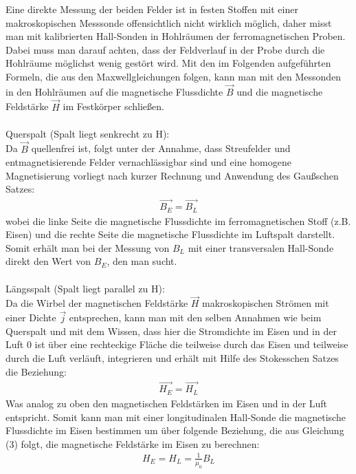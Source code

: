 \documentclass[a4paper,10pt]{scrartcl}
\begin{document}
		Eine direkte Messung der beiden Felder ist in festen Stoffen mit einer makroskopischen Messsonde offensichtlich nicht wirklich möglich, daher misst man mit kalibrierten Hall-Sonden in Hohlräumen der ferromagnetischen Proben. Dabei muss man darauf achten, dass der Feldverlauf in der Probe durch die Hohlräume möglichst wenig gestört wird. Mit den im Folgenden aufgeführten Formeln, die aus den Maxwellgleichungen folgen, kann man mit den Messonden in den Hohlräumen auf die magnetische Flussdichte \(\vec{B}\) und die magnetische Feldstärke \(\vec{H}\) im Festkörper schließen.\\
		\\
		Querspalt (Spalt liegt senkrecht zu H):\\
		Da \(\vec{B}\) quellenfrei ist, folgt unter der Annahme, dass Streufelder und entmagnetisierende Felder vernachlässigbar sind und eine homogene Magnetisierung vorliegt nach kurzer Rechnung und Anwendung des Gaußschen Satzes:
		\begin{align}
		\vec{B_{E}}=\vec{B_{L}}
		\end{align}
		wobei die linke Seite die magnetische Flussdichte im ferromagnetischen Stoff (z.B. Eisen) und die rechte Seite die magnetische Flussdichte im Luftspalt darstellt. Somit erhält man bei der Messung von \(B_{L}\) mit einer transversalen Hall-Sonde direkt den Wert von \(B_{E}\), den man sucht.\\
		\\
		Längsspalt (Spalt liegt parallel zu H):\\
		Da die Wirbel der magnetischen Feldstärke \(\vec{H}\) makroskopischen Strömen mit einer Dichte \(\vec{j}\) entsprechen, kann man mit den selben Annahmen wie beim Querspalt und mit dem Wissen, dass hier die Stromdichte im Eisen und in der Luft 0 ist über eine rechteckige Fläche die teilweise durch das Eisen und teilweise durch die Luft verläuft, integrieren und erhält mit Hilfe des Stokesschen Satzes die Beziehung:
		\begin{align}
		\vec{H_{E}}=\vec{H_{L}}
		\end{align}
		Was analog zu oben den magnetischen Feldstärken im Eisen und in der Luft entspricht. Somit kann man mit einer longitudinalen Hall-Sonde die magnetische Flussdichte im Eisen bestimmen um über folgende Beziehung, die aus Gleichung (3) folgt, die magnetische Feldstärke im Eisen zu berechnen:
		\begin{align}
		H_{E}=H_{L}=\frac{1}{\mu_{0}}B_{L}
		\end{align}
		
\end{document}
